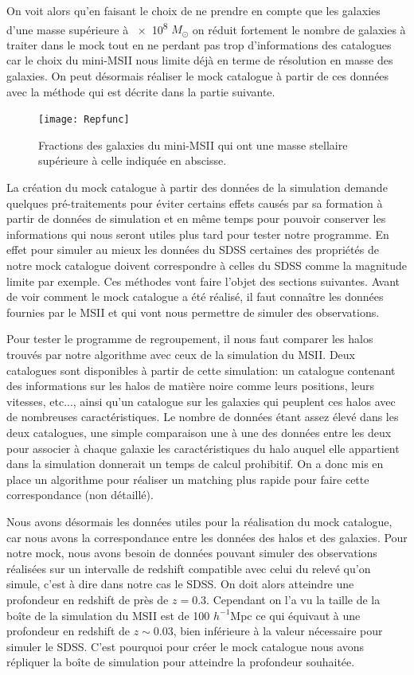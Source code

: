 On voit alors qu'en faisant le choix de ne prendre en compte que les galaxies d'une masse supérieure à \num{e8} $M_{\odot}$ on
réduit fortement le nombre de galaxies à traiter dans le mock tout en ne perdant pas trop d'informations des catalogues car le
choix du mini-MSII nous limite déjà en terme de résolution en masse des galaxies. On peut désormais réaliser le mock catalogue à
partir de ces données avec la méthode qui est décrite dans la partie suivante.
\begin{figure}[H]
	\centering
	\texttt{[image: Repfunc]}
	\caption{\footnotesize{}Fractions des galaxies du mini-MSII qui ont une masse stellaire supérieure à celle indiquée en
	abscisse.}
	\label{fig:repMste}
\end{figure}
La création du mock catalogue à partir des données de la simulation demande quelques pré-traitements pour éviter certains effets
causés par sa formation à partir de données de simulation et en même temps pour pouvoir conserver les informations qui nous seront
utiles plus tard pour tester notre programme. En effet pour simuler au mieux les données du SDSS certaines des propriétés de notre
mock catalogue doivent correspondre à celles du SDSS comme la magnitude limite par exemple. Ces méthodes vont faire l'objet des
sections suivantes.
Avant de voir comment le mock catalogue a été réalisé, il faut connaître les données fournies par le MSII et qui vont nous
permettre de simuler des observations.

Pour tester le programme de regroupement, il nous faut comparer les halos trouvés par notre algorithme avec ceux de la simulation
du MSII. Deux catalogues sont disponibles à partir de cette simulation: un catalogue contenant des informations sur les halos de
matière noire comme leurs positions, leurs vitesses, etc..., ainsi qu'un catalogue sur les galaxies qui peuplent ces halos avec de
nombreuses caractéristiques. Le nombre de données étant assez élevé dans les deux catalogues, une simple comparaison une à une des
données entre les deux pour associer à chaque galaxie les caractéristiques du halo auquel elle appartient dans la simulation
donnerait un temps de calcul prohibitif. On a donc mis en place un algorithme pour réaliser un matching plus rapide pour faire
cette correspondance (non détaillé).%

Nous avons désormais les données utiles pour la réalisation du mock catalogue, car nous avons la correspondance entre les données
des halos et des galaxies.
Pour notre mock, nous avons besoin de données pouvant simuler des observations réalisées sur un intervalle de redshift compatible
avec celui du relevé qu'on simule, c'est à dire dans notre cas le SDSS. On doit alors atteindre une profondeur en redshift de près
de $z=\num{0.3}$. Cependant on l'a vu la taille de la boîte de la simulation du MSII est de \num{100} $h^{-1}$Mpc ce qui équivaut à
une profondeur en redshift de $z\sim\num{0.03}$, bien inférieure à la valeur nécessaire pour simuler le SDSS. C'est pourquoi pour
créer le mock catalogue nous avons répliquer la boîte de simulation pour atteindre la profondeur souhaitée.


